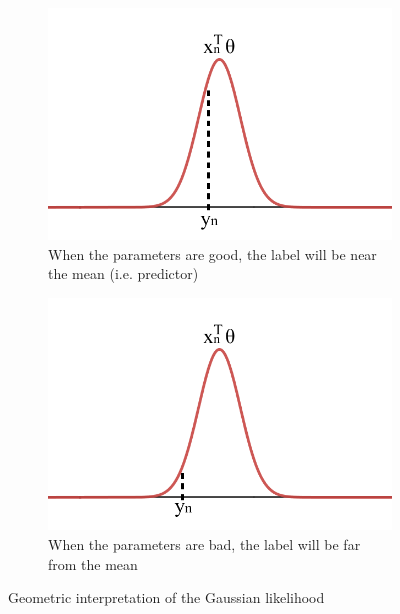 \begin{description}
        \begin{figure}[H]
            \begin{subfigure}{.45\textwidth}
                \centering
                \includegraphics[width=.75\linewidth]{img/gaussian_mle_good.png}
                \caption{When the parameters are good, the label will be near the mean (i.e. predictor)}
            \end{subfigure}
            \hspace*{1em}
            \begin{subfigure}{.45\textwidth}
                \centering
                \includegraphics[width=.75\linewidth]{img/gaussian_mle_bad.png}
                \caption{When the parameters are bad, the label will be far from the mean}
            \end{subfigure}

            \caption{Geometric interpretation of the Gaussian likelihood}
        \end{figure}
\end{description}


